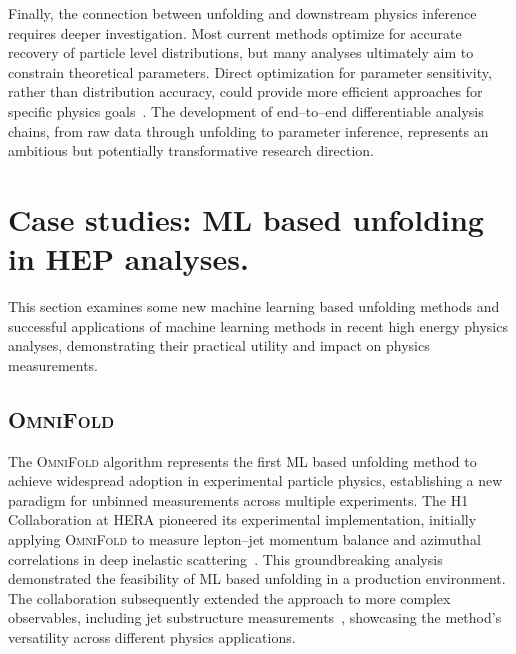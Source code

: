         Finally, the connection between unfolding and downstream physics inference requires deeper investigation.
        Most current methods optimize for accurate recovery of particle level distributions, but many analyses ultimately aim to constrain theoretical parameters.
        Direct optimization for parameter sensitivity, rather than distribution accuracy, could provide more efficient approaches for specific physics goals~\cite{Brehmer2020EffectiveLearning}.
        The development of end--to--end differentiable analysis chains, from raw data through unfolding to parameter inference, represents an ambitious but potentially transformative research direction.

\section{Case studies: ML based unfolding in HEP analyses.}

This section examines some new machine learning based unfolding methods and successful applications of machine learning methods in recent high energy physics analyses, demonstrating their practical utility and impact on physics measurements.

\subsection{\textsc{OmniFold}}  
    The \textsc{OmniFold} algorithm represents the first ML based unfolding method to achieve widespread adoption in experimental particle physics, establishing a new paradigm for unbinned measurements across multiple experiments.
    The H1 Collaboration at HERA pioneered its experimental implementation, initially applying \textsc{OmniFold} to measure lepton--jet momentum balance and azimuthal correlations in deep inelastic scattering~\cite{collaboration_measurement_2022}.
    This groundbreaking analysis demonstrated the feasibility of ML based unfolding in a production environment.
    The collaboration subsequently extended the approach to more complex observables, including jet substructure measurements~\cite{collaboration_unbinned_2023,Arratia2025TowardsEvents}, showcasing the method's versatility across different physics applications.
    
